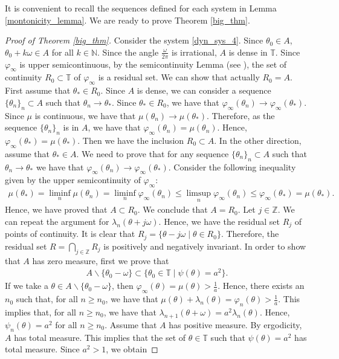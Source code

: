 \documentclass[12pt]{article}
\newcommand{\N}{\mathbb{N}}
\newcommand{\Z}{\mathbb{Z}}
\newcommand{\T}{\mathbb{T}}
\theoremstyle{plain}
\theoremstyle{remark}
\theoremstyle{definition}
\begin{document}
It is convenient to recall the sequences defined for each system in Lemma \ref{montonicity_lemma}. We are ready to prove Theorem \ref{big_thm}.
\begin{proof}[Proof of Theorem \ref{big_thm}]
    Consider the system \eqref{dyn_sys_4}. Since $\theta_0\in A$, $\theta_0+k\omega\in A$ for all $k\in\N$. Since the angle $\frac{\omega}{2\pi}$ is irrational, $A$ is dense in $\T$. Since $\varphi_\infty$ is upper semicontinuous, by the semicontinuity Lemma (see \cite[Theorem 11.4]{roo1982real}), the set of continuity $R_0\subset\T$ of $\varphi_\infty$ is a residual set.         
    We can show that actually $R_0=A$. 
    First assume that $\theta_*\in R_0$. Since $A$ is dense, we can consider a sequence $\{\theta_n\}_n\subset A$ such that $\theta_n\to\theta_*$. Since $\theta_*\in R_0$, we have that $\varphi_\infty(\theta_n)\to\varphi_\infty(\theta_*)$. Since $\mu$ is continuous, we have that $\mu(\theta_n)\to\mu(\theta_*)$. Therefore, as the sequence $\{\theta_n\}_n$ is in $A$, we have that $\varphi_\infty(\theta_n)=\mu(\theta_n)$. Hence, $\varphi_\infty(\theta_*)=\mu(\theta_*)$. Then we have the inclusion $R_0\subset A$. In the other direction, assume that $\theta_*\in A$. We need to prove that for any sequence $\{\theta_n\}_n\subset A$ such that $\theta_n\to\theta_*$ we have that $\varphi_\infty(\theta_n)\to\varphi_\infty(\theta_*)$. Consider the following inequality given by the upper semicontinuity of $\varphi_\infty$:
    \begin{align*}
        \mu(\theta_*) = \liminf_n \mu(\theta_n) = \liminf_n \varphi_\infty(\theta_n) \leq \limsup_n \varphi_\infty(\theta_n) \leq \varphi_\infty(\theta_*) = \mu(\theta_*).
    \end{align*}
    Hence, we have proved that $A\subset R_0$. We conclude that $A=R_0$. Let $j\in\Z$. We can repeat the argument for $\lambda_n(\theta+j\omega)$. Hence, we have the residual set $R_j$ of points of continuity. It is clear that $R_j=\{\theta-j\omega\mid\theta\in R_0\}$. Therefore, the residual set $R=\bigcap_{j\in\Z}R_j$ is positively and negatively invariant.
    In order to show that $A$ has zero measure, first we prove that
    \begin{align*}
        A\smallsetminus\{\theta_0-\omega\}\subset\{\theta_0\in \T\mid\psi(\theta)=a^2\}.
    \end{align*}
    If we take a $\theta\in A\smallsetminus\{\theta_0-\omega\}$, then $\varphi_\infty(\theta)=\mu(\theta)>\frac{1}{a}$. Hence, there exists an $n_0$ such that, for all $n\geq n_0$, we have that $\mu(\theta)+\lambda_n(\theta)=\varphi_n(\theta)>\frac{1}{a}$. This implies that, for all $n\geq n_0$, we have that $\lambda_{n+1}(\theta+\omega)=a^2\lambda_{n}(\theta)$. Hence, $\psi_n(\theta)=a^2$ for all $n\geq n_0$. Assume that $A$ has positive measure. By ergodicity, $A$ has total measure. This implies that the set of $\theta\in\T$ such that $\psi(\theta)=a^2$ has total measure. Since $a^2>1$, we obtain

\end{proof}
\end{document}
